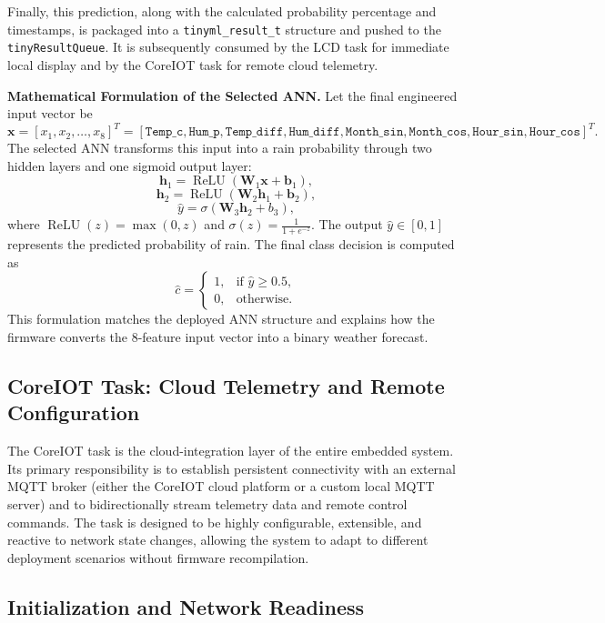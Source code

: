 Finally, this prediction, along with the calculated probability percentage and timestamps, is packaged into a \texttt{tinyml\_result\_t} structure and pushed to the \texttt{tinyResultQueue}. It is subsequently consumed by the LCD task for immediate local display and by the CoreIOT task for remote cloud telemetry.

\noindent\textbf{Mathematical Formulation of the Selected ANN.} Let the final engineered input vector be
\[
\mathbf{x} = [x_1, x_2, \ldots, x_8]^T
= [\texttt{Temp\_c}, \texttt{Hum\_p}, \texttt{Temp\_diff}, \texttt{Hum\_diff}, \texttt{Month\_sin}, \texttt{Month\_cos}, \texttt{Hour\_sin}, \texttt{Hour\_cos}]^T.
\]
The selected ANN transforms this input into a rain probability through two hidden layers and one sigmoid output layer:
\[
\mathbf{h}_1 = \operatorname{ReLU}(\mathbf{W}_1\mathbf{x} + \mathbf{b}_1),
\]
\[
\mathbf{h}_2 = \operatorname{ReLU}(\mathbf{W}_2\mathbf{h}_1 + \mathbf{b}_2),
\]
\[
\hat{y} = \sigma(\mathbf{W}_3\mathbf{h}_2 + b_3),
\]
where \(\operatorname{ReLU}(z) = \max(0, z)\) and \(\sigma(z) = \frac{1}{1 + e^{-z}}\). The output \(\hat{y} \in [0,1]\) represents the predicted probability of rain. The final class decision is computed as
\[
\hat{c} =
\begin{cases}
1, & \text{if } \hat{y} \geq 0.5, \\
0, & \text{otherwise}.
\end{cases}
\]
This formulation matches the deployed ANN structure and explains how the firmware converts the 8-feature input vector into a binary weather forecast.


\subsection{CoreIOT Task: Cloud Telemetry and Remote Configuration}

The CoreIOT task is the cloud-integration layer of the entire embedded system. Its primary responsibility is to establish persistent connectivity with an external MQTT broker (either the CoreIOT cloud platform or a custom local MQTT server) and to bidirectionally stream telemetry data and remote control commands. The task is designed to be highly configurable, extensible, and reactive to network state changes, allowing the system to adapt to different deployment scenarios without firmware recompilation.

\subsection*{Initialization and Network Readiness}

